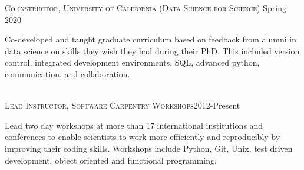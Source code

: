 \documentclass[10pt]{cv}
\begin{document}
\begin{llist}
\textsc{Co-instructor, University of California (Data Science for Science)} \hfill Spring 2020\\
\begin{minipage}[l]{0.7\textwidth}\vspace{0.15cm}
Co-developed and taught graduate curriculum based on feedback from alumni in data science on skills they wish they had during their PhD. This included version control, integrated development environments, SQL, advanced python, communication, and collaboration.\\
\end{minipage}\vspace{0.15cm}
\\
\textsc{Lead Instructor, Software Carpentry Workshops}\hfill 2012-Present\\
\begin{minipage}[l]{0.7\textwidth}\vspace{0.15cm}
Lead two day workshops at more than 17 international institutions and conferences to enable scientists to work more efficiently and reproducibly by improving their coding skills. Workshops include Python, Git, Unix, test driven development, object oriented and functional programming. \\
\end{minipage}\vspace{0.15cm}

\end{llist}
\end{document}
